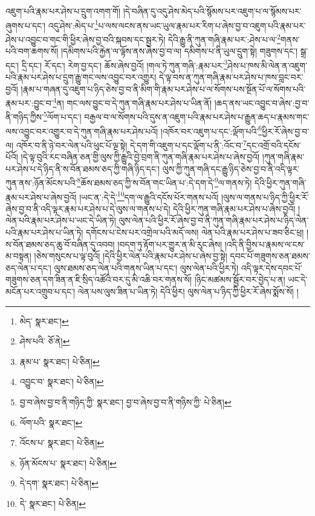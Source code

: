 འཇུག་པའི་རྣམ་པར་ཤེས་པ་དྲུག་འགག་གོ། །དེ་བཞིན་དུ་འདུ་ཤེས་མེད་པའི་སྙོམས་པར་འཇུག་པ་ལ་སྙོམས་པར་ཞུགས་པ་དང་། འདུ་ཤེས་:མེད་པ་\footnote{མེད་  སྣར་ཐང་། }པ་ལས་ལངས་ནས་ཡང་ཡུལ་རྣམ་པར་རིག་པ་ཞེས་བྱ་བ་འཇུག་པའི་རྣམ་པར་ཤེས་པ་འབྱུང་བ་གང་གི་ཕྱིར་ཞེས་བྱ་བའི་སྐབས་དང་སྦྱར་ཏེ། དེའི་རྒྱུ་ནི་ཀུན་གཞི་རྣམ་པར་:ཤེས་པ་ལ་\footnote{ཤེས་པའི་  ཅོ་ནེ། }གནས་པའི་བག་ཆགས་སོ། །དམིགས་པའི་རྐྱེན་ལ་ལྟོས་ནས་ཞེས་བྱ་བ་ལ། དམིགས་པ་ནི་ཡུལ་དྲུག་སྟེ། གཟུགས་དང་། སྒྲ་དང་། དྲི་དང་། རོ་དང་། རེག་བྱ་དང་། ཆོས་ཞེས་བྱའོ། །གལ་ཏེ་ཀུན་གཞི་:རྣམ་པར་\footnote{རྣམ་པ་  སྣར་ཐང་།  པེ་ཅིན། }ཤེས་པ་ཁས་མི་ལེན་ན་འཇུག་པའི་རྣམ་པར་ཤེས་པ་དྲུག་རྒྱུ་གང་ལས་འབྱུང་བར་འགྱུར། དེ་ལྟ་བས་ན་ཀུན་གཞི་རྣམ་པར་ཤེས་པ་ཁས་བླང་བར་བྱའོ། །རྣམ་པ་གཞན་དུ་འཇུག་པ་ཉིད་ཅེས་བྱ་བ་ནི་མིག་གི་རྣམ་པར་ཤེས་པ་ལ་སོགས་པས་སྔོན་པོ་ལ་སོགས་པའི་རྣམ་པར་:བྱུང་བ་\footnote{འབྱུང་བ་  སྣར་ཐང་།  པེ་ཅིན། }ན། གང་ལས་བྱུང་བ་དེ་ཀུན་གཞི་རྣམ་པར་ཤེས་པ་ཡིན་ནོ། །ཆད་ནས་ཡང་འབྱུང་བ་ཞེས་:བྱ་བ་ནི་གཉིད་ཀྱིས་\footnote{བྱ་བ་ཞེས་བྱ་བ་ནི་གཉིད་ཀྱི་  སྣར་ཐང་། བྱ་བ་ཞེས་བྱ་བ་ནི་གཉིས་ཀྱི་  པེ་ཅིན། }ལོག་པ་དང་། བརྒྱལ་བ་ལ་སོགས་པའི་དུས་ན་འཇུག་པའི་རྣམ་པར་ཤེས་པ་རྒྱུན་ཆད་པ་རྣམས་གང་ལས་འབྱུང་བར་འགྱུར་བ་དེ་ཀུན་གཞི་རྣམ་པར་ཤེས་པའོ། །འཁོར་བར་འཇུག་པ་དང་:ལྡོག་པའི་\footnote{ལོག་པའི་  སྣར་ཐང་། }ཕྱིར་རོ་ཞེས་བྱ་བ་ལ། འཁོར་བ་ནི་ཉེ་བར་ལེན་པའི་ཕུང་པོ་ལྔ་སྟེ། དེ་དག་གི་འཇུག་པ་དང་ལྡོག་པ་ནི་:འོང་བ་\footnote{འོངས་པ་  སྣར་ཐང་།  པེ་ཅིན། }དང་འགྲོ་བའི་དངོས་པོའོ། །དེ་ལྟ་བུའི་རང་བཞིན་ཅན་གྱི་ལུས་ཀྱི་རྒྱུའི་བྱེ་བྲག་ནི་ཀུན་གཞི་རྣམ་པར་ཤེས་པ་ཞེས་བྱའོ། །ཀུན་གཞི་རྣམ་པར་ཤེས་པ་དེ་ཉིད་ནི་ས་བོན་ཐམས་ཅད་ཀྱི་གཞི་ཉིད་དང་། ལུས་ཀྱི་ཀུན་གཞི་དང་རྒྱུ་ཉིད་ཅེས་བྱ་བ་ནི་འདི་ལྟར་ཀུན་ནས་:ཉོན་མོངས་པའི་\footnote{ཉོན་མོངས་པ་  སྣར་ཐང་།  པེ་ཅིན། }ཆོས་ཐམས་ཅད་ཀྱི་ས་བོན་གང་ཡིན་པ་:དེ་དག་དེ་\footnote{དེ་དག་  སྣར་ཐང་།  པེ་ཅིན། }ལ་གནས་ཏེ། དེའི་ཕྱིར་ཀུན་གཞི་རྣམ་པར་ཤེས་པ་ཞེས་བྱའོ། །ཡང་ན་:དེ་དེ་\footnote{དེ་  སྣར་ཐང་།  པེ་ཅིན། }དག་ལ་རྒྱུའི་དངོས་པོར་གནས་པའོ། །ལུས་ལ་གནས་པ་ཉིད་ཀྱི་ཕྱིར་རོ་ཞེས་བྱ་བ་ནི་འདི་ལྟར་རྣམ་པར་ཤེས་པ་དེ་ལུས་ལ་གནས་པ་དེ། དེའི་ཕྱིར་ཀུན་གཞི་རྣམ་པར་ཤེས་པ་ཞེས་བྱའོ། །ལེན་པའི་རྣམ་པར་ཤེས་པ་ཡང་དེ་ཡིན་ཏེ། ལུས་ལེན་པའི་ཕྱིར་རོ་ཞེས་བྱ་བ་ནི་ཀུན་གཞི་རྣམ་པར་ཤེས་པ་ཉིད་ལེན་པའི་རྣམ་པར་ཤེས་པ་ཡིན་ཏེ། དགོངས་པ་ངེས་པར་འགྲེལ་པའི་མདོ་ལས། ལེན་པའི་རྣམ་པར་ཤེས་པ་ཟབ་ཅིང་ཕྲ། །ས་བོན་ཐམས་ཅད་ཆུ་བོ་བཞིན་དུ་འབབ། །བདག་ཏུ་རྟོག་པར་གྱུར་ན་མི་རུང་ཞེས། །འདི་ནི་བྱིས་པ་རྣམས་ལ་ངས་མ་བསྟན། །ཅེས་གསུངས་པ་ལྟ་བུའོ། །དེའི་ཕྱིར་ལེན་པའི་རྣམ་པར་ཤེས་པ་ཞེས་བྱ་སྟེ། དབང་པོ་གཟུགས་ཅན་ཐམས་ཅད་ལེན་པ་དང་། ལུས་ཐམས་ཅད་ལེན་པའི་གནས་ཡིན་པ་དང་། ལུས་ལེན་པའི་ཕྱིར་ཏེ། འདི་ལྟར་དེས་དབང་པོ་གཟུགས་ཅན་དག་ཟིན་ན་ཇི་སྲིད་འཚོའི་བར་དུ་མི་འཆི་བར་གནས་སོ། །ཉིང་མཚམས་སྦྱོར་བར་བྱེད་པ་ན། ཡང་དེ་མངོན་པར་འགྲུབ་པ་དང་། ལེན་པས་ལུས་ཟིན་པ་ཡིན་ཏེ། དེའི་ཕྱིར། ལུས་ལེན་པ་ཉིད་ཀྱི་ཕྱིར་རོ་ཞེས་སྨོས་སོ། །
